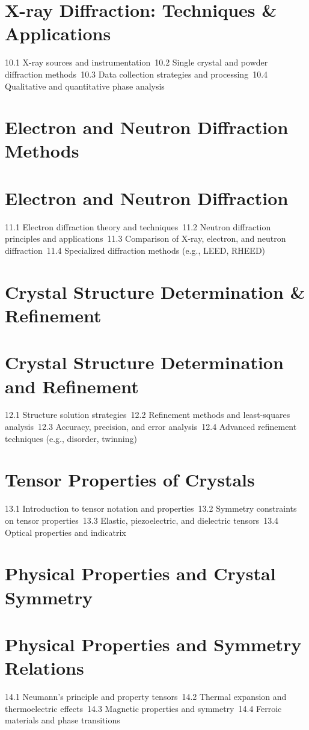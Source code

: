 \section{X-ray Diffraction: Techniques \& Applications}
10.1 X-ray sources and instrumentation\
10.2 Single crystal and powder diffraction methods\
10.3 Data collection strategies and processing\
10.4 Qualitative and quantitative phase analysis\
\section{Electron and Neutron Diffraction Methods}
\section{Electron and Neutron Diffraction}
11.1 Electron diffraction theory and techniques\
11.2 Neutron diffraction principles and applications\
11.3 Comparison of X-ray, electron, and neutron diffraction\
11.4 Specialized diffraction methods (e.g., LEED, RHEED)\
\section{Crystal Structure Determination \& Refinement}
\section{Crystal Structure Determination and Refinement}
12.1 Structure solution strategies\
12.2 Refinement methods and least-squares analysis\
12.3 Accuracy, precision, and error analysis\
12.4 Advanced refinement techniques (e.g., disorder, twinning)\
\section{Tensor Properties of Crystals}
13.1 Introduction to tensor notation and properties\
13.2 Symmetry constraints on tensor properties\
13.3 Elastic, piezoelectric, and dielectric tensors\
13.4 Optical properties and indicatrix\
\section{Physical Properties and Crystal Symmetry}
\section{Physical Properties and Symmetry Relations}
14.1 Neumann's principle and property tensors\
14.2 Thermal expansion and thermoelectric effects\
14.3 Magnetic properties and symmetry\
14.4 Ferroic materials and phase transitions\
